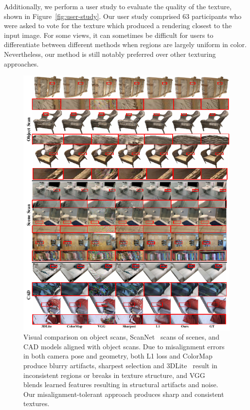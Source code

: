Additionally, we perform a user study to evaluate the quality of the texture, shown in Figure~\ref{fig:user-study}.
Our user study comprised $63$ participants who were asked to vote for the texture which produced a rendering closest to the input image. 
For some views, it can sometimes be difficult for users to differentiate between different methods when regions are largely uniform in color. 
Nevertheless, our method is  still notably preferred over other texturing approaches.
\begin{figure}
    \centering
    \includegraphics[width=\linewidth,height=1.15\linewidth]{texturegen/figures/result.pdf}
    \caption{Visual comparison on object scans, ScanNet~\cite{dai2017scannet} scans of scenes, and CAD models aligned with object scans. Due to misalignment errors in both camera pose and geometry, both L1 loss and ColorMap~\cite{zhou2014color} produce blurry artifacts, sharpest selection and 3DLite~\cite{huang20173dlite} result in inconsistent regions or breaks in texture structure, and VGG~\cite{johnson2016perceptual} blends learned features resulting in structural artifacts and noise. Our misalignment-tolerant approach produces sharp and consistent textures.}
    \label{fig:toptim-object-scan}
\end{figure}